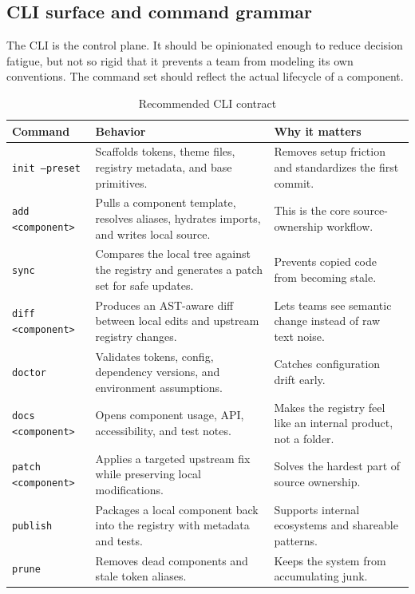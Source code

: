 \documentclass[11pt,twoside,a4paper]{article}
\begin{document}
\subsection{CLI surface and command grammar}
The CLI is the control plane. It should be opinionated enough to reduce decision fatigue, but not so rigid that it prevents a team from modeling its own conventions. The command set should reflect the actual lifecycle of a component.

\begin{table}[htbp]
  \centering
  \caption{Recommended CLI contract}
  \begin{tabularx}{\textwidth}{@{}p{}p{}Y@{}}
    \toprule
    \textbf{Command} & \textbf{Behavior} & \textbf{Why it matters} \\
    \midrule
    \texttt{init --preset} & Scaffolds tokens, theme files, registry metadata, and base primitives. & Removes setup friction and standardizes the first commit. \\
    \texttt{add <component>} & Pulls a component template, resolves aliases, hydrates imports, and writes local source. & This is the core source-ownership workflow. \\
    \texttt{sync} & Compares the local tree against the registry and generates a patch set for safe updates. & Prevents copied code from becoming stale. \\
    \texttt{diff <component>} & Produces an AST-aware diff between local edits and upstream registry changes. & Lets teams see semantic change instead of raw text noise. \\
    \texttt{doctor} & Validates tokens, config, dependency versions, and environment assumptions. & Catches configuration drift early. \\
    \texttt{docs <component>} & Opens component usage, API, accessibility, and test notes. & Makes the registry feel like an internal product, not a folder. \\
    \texttt{patch <component>} & Applies a targeted upstream fix while preserving local modifications. & Solves the hardest part of source ownership. \\
    \texttt{publish} & Packages a local component back into the registry with metadata and tests. & Supports internal ecosystems and shareable patterns. \\
    \texttt{prune} & Removes dead components and stale token aliases. & Keeps the system from accumulating junk. \\
    \bottomrule
  \end{tabularx}
\end{table}
\end{document}
